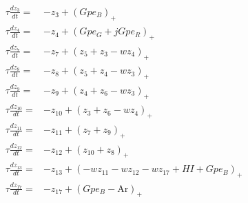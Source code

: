 \documentclass[preprint,12pt]{elsarticle}
\begin{document}
\begin{align}
\tau \frac{dz_3}{dt} =& -z_3 + (Gpe_{B})_+
\label{eq:Z_3}
\\
\tau \frac{dz_4}{dt} =& -z_4 + (Gpe_{G} + j   Gpe_{R})_+
\\
\tau \frac{dz_7}{dt} =& -z_7 + (z_5 + z_3 - w   z_4)_+
\\
\tau \frac{dz_8}{dt} =& -z_8 + (z_5 + z_4 - w   z_3)_+
\\
\tau \frac{dz_9}{dt} =& -z_9 + (z_4 + z_6 - w   z_3)_+
\\
\tau \frac{dz_{10}}{dt} =& -z_{10} + (z_3 + z_6 - w   z_4)_+
\\
\tau \frac{dz_{11}}{dt} =& -z_{11} + (z_7 + z_9)_+
\\
\tau \frac{dz_{12}}{dt} =& -z_{12} + (z_{10} + z_8)_+
\\
\tau \frac{dz_{13}}{dt} =& -z_{13} + (-w z_{11} - w z_{12}
- w z_{17} + HI + Gpe_{B} )_+
\label{eq:Z_13}
\\
\tau \frac{dz_{17}}{dt} =& -z_{17} + (Gpe_{B} - \text{Ar})_+
\label{eq:Z_17}
\end{align}
\end{document}
